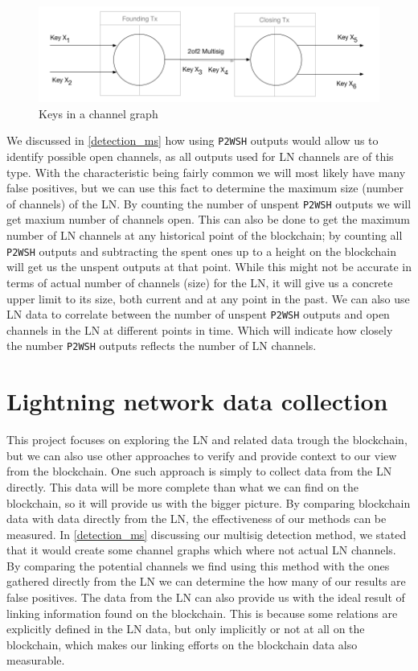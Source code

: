 \begin{figure}[h]
    \centering
    \includegraphics[width=14cm]{figures/keys_subgraph.png}
    \caption{Keys in a channel graph}
    \label{fig:keys_graphs}
\end{figure}

We discussed in \cref{detection_ms} how using {\tt P2WSH} outputs would allow us to identify possible open channels, as all outputs used for LN channels are of this type. With the characteristic being fairly common we will most likely have many false positives, but we can use this fact to determine the maximum size (number of channels) of the LN.
By counting the number of unspent {\tt P2WSH} outputs we will get maxium number of channels open. This can also be done to get the maximum number of LN channels at any historical point of the blockchain;
by counting all {\tt P2WSH} outputs and subtracting the spent ones up to a height on the blockchain will get us the unspent outputs at that point.
While this might not be accurate in terms of actual number of channels (size) for the LN, it will give us a concrete upper limit to its size, both current and at any point in the past.
We can also use LN data to correlate between the number of unspent {\tt P2WSH} outputs and open channels in the LN at different points in time. Which will indicate how closely the number {\tt P2WSH} outputs reflects the number of LN channels.

\section{Lightning network data collection}
\label{sec:ln_analysis}

This project focuses on exploring the LN and related data trough the blockchain, but we can also use other approaches to verify and provide context to our view from the blockchain.
One such approach is simply to collect data from the LN directly.
This data will be more complete than what we can find on the blockchain, so it will provide us with the bigger picture. By comparing blockchain data with data directly from the LN, the effectiveness of our methods can be measured. In \cref{detection_ms} discussing our multisig detection method, we stated that it would create some channel graphs which where not actual LN channels. By comparing the potential channels we find using this method with the ones gathered directly from the LN we can determine the how many of our results are false positives.
The data from the LN can also provide us with the ideal result of linking information found on the blockchain. This is because some relations are explicitly defined in the LN data, but only implicitly or not at all on the blockchain, which makes our linking efforts on the blockchain data also measurable.
\\

